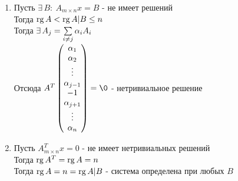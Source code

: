 \documentclass[12pt]{article}
\begin{document}
\begin{enumerate}
    \item Пусть $\exists\,B:\ A_{m \times n}x=B$ - не имеет решений\\
    Тогда $\operatorname{rg} A < \operatorname{rg} A|B \leq n$\\
    Тогда $\exists\, A_j = \sum\limits_{i\neq j} \alpha_i A_i$\\
    Отсюда $A^T \begin{pmatrix}
        \alpha_1\\\alpha_2\\\vdots\\\alpha_{j-1}\\-1\\\alpha_{j+1}\\\vdots\\\alpha_n
    \end{pmatrix} = \0$ - нетривиальное решение
    \item Пусть $A_{m\times n}^Tx = 0$ - не имеет нетривиальных решений\\
    Тогда $\operatorname{rg} A^T = \operatorname{rg} A = n$\\
    Тогда $\operatorname{rg} A = n = \operatorname{rg} A|B$ - система определена при любых $B$
\end{enumerate}
\end{document}

